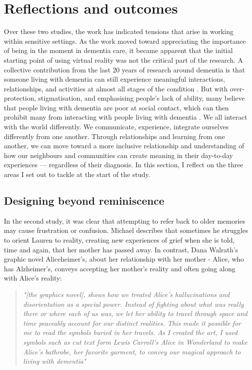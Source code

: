 \section{Reflections and outcomes}
\label{S2:Reflection}
Over these two studies, the work has indicated tensions that arise in working within sensitive settings. As the work moved toward appreciating the importance of being in the moment in dementia care, it became apparent that the initial starting point of using virtual reality was not the critical part of the research. A collective contribution from the last 20 years of research around dementia is that someone living with dementia can still experience meaningful interactions, relationships, and activities at almost all stages of the condition \citep{kitwood1997dementia}. But with over-protection, stigmatisation, and emphasising people’s lack of ability, many believe that people living with dementia are poor at social contact, which can then prohibit many from interacting with people living with dementia \citep{christine_bryden_dancing_2005, riley_anxiety_2014}. We all interact with the world differently. We communicate, experience, integrate ourselves differently from one another. Through relationships and learning from one another, we can move toward a more inclusive relationship and understanding of how our neighbours and communities can create meaning in their day-to-day experiences — regardless of their diagnosis. In this section, I reflect on the three areas I set out to tackle at the start of the study.

\subsection{Designing beyond reminiscence}
\label{beyond-reminiscence}
In the second study, it was clear that attempting to refer back to older memories may cause frustration or confusion. Michael describes that sometimes he struggles to orient Lauren to reality, creating new experiences of grief when she is told, time and again, that her mother has passed away. In contrast, Dana Walrath's graphic novel Aliceheimer's, about her relationship with her mother - Alice, who has Alzheimer's, conveys accepting her mother's reality and often going along with Alice's reality:

\begin{quote}
\textit{"[the graphics novel], shows how we treated Alice's hallucinations and disorientation as a special power. Instead of fighting about what was really there or where each of us was, we let her ability to travel through space and time peaceably account for our distinct realities. This made it possible for me to read the symbols buried in her travels. As I created the art, I used symbols such as cut text form Lewis Carroll's Alice in Wonderland to make Alice's bathrobe, her favorite garment, to convey our magical approach to living with dementia" \citep{walrath2021aliceheimer,walrath2017end}}
\end{quote}

